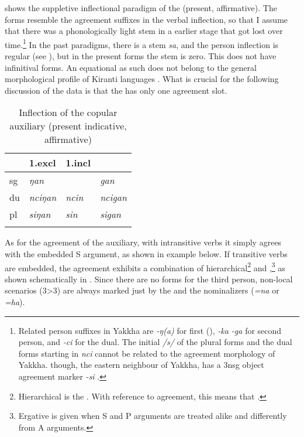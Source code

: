  shows the suppletive inflectional paradigm of the  (present, affirmative). The forms resemble the agreement suffixes in the verbal inflection, so that I assume that there was a phonologically light stem in a earlier stage that got lost over time.\footnote{Related person suffixes in Yakkha are \emph{-ŋ(a)} for first  (), \emph{-ka \ti -ga} for second person, and \emph{-ci} for the dual. The initial  \emph{/s/} of the plural  forms and the dual forms starting in \emph{nci} cannot be related to the agreement morphology of Yakkha.  though, the eastern neighbour of Yakkha, has a 3nsg object agreement marker \emph{-si} \citep[76]{Driem1987A-grammar}.}  In the past paradigms, there is a stem \emph{sa}, and the person inflection is regular (see ), but in the present forms the stem is zero. This  does not have infinitival forms. An equational  as such does not belong to the general morphological profile of Kiranti languages \citep[276]{Bickel1999Nominalization}. What is crucial for the following discussion of the data is that the  has only one agreement slot.


\begin{table}[h]
\begin{center}
\begin{tabular}{llll}
\lsptoprule
&{\sc 1.excl}&{\sc 1.incl}&{\sc 2}\\
\midrule
{\sc sg}&  \emph{ŋan}& &\emph{gan}\\
{\sc du} & \emph{nciŋan}&\emph{ncin}& \emph{ncigan} \\
{\sc pl}  & \emph{siŋan}& \emph{sin}&\emph{sigan}\\
\lspbottomrule
\end{tabular}
\caption{Inflection of the copular auxiliary (present indicative, affirmative)}\label{copula}
\end{center}
\end{table}



As for the agreement of the auxiliary, with intransitive verbs it simply agrees with the embedded S argument, as shown in example \Next[a] below. If transitive verbs are embedded, the agreement exhibits a combination of hierarchical\footnote{Hierarchical  is the  \citep[10]{Siewierska1998On-nominal}. With reference to agreement, this means that   \citep[66]{Nichols1992Language}.} and  ,\footnote{Ergative  is given when S and P arguments are treated alike and differently from A arguments. 
} as shown schematically in .  Since there are no forms for the third person, non-local scenarios (3>3) are always marked just by the  and the nominalizers (\emph{=na} or \emph{=ha}). 


